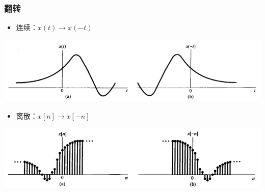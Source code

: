 \documentclass[CJKutf8,xcolor=pdftex,dvipsnames,table]{beamer}
\begin{document}
\begin{CJK*}{UTF8}{song}
  \begin{frame}
    \frametitle{翻转}
    \begin{itemize}
    \item 连续：$x(t) \rightarrow x(-t)$
    \end{itemize}
    \begin{center}
      \includegraphics[scale=.4]{creversal}
    \end{center}
    \begin{itemize}
    \item 离散：$x[n] \rightarrow x[-n]$    
    \end{itemize}
    \begin{center}
      \includegraphics[scale=.4]{dreversal}
    \end{center}
  \end{frame}  


\end{CJK*}
\end{document}
